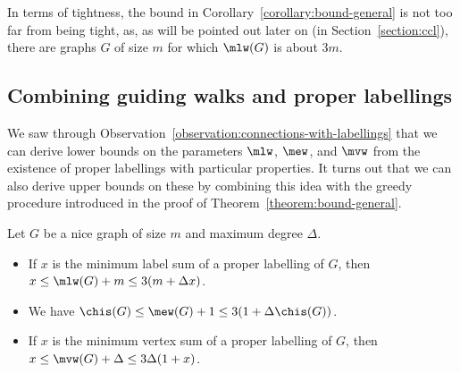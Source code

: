 \documentclass[a4paper,11pt,dvipsnames]{elsarticle}
\begin{document}
\medskip

In terms of tightness, the bound in Corollary~\ref{corollary:bound-general} is not too far from being tight, as, as will be pointed out later on (in Section~\ref{section:ccl}), there are graphs $G$ of size $m$ for which $\mlw(G)$ is about $3m$.

\subsection{Combining guiding walks and proper labellings}

We saw through Observation~\ref{observation:connections-with-labellings} that we can derive lower bounds on the parameters $\mlw$, $\mew$, and $\mvw$ from the existence of proper labellings with particular properties. It turns out that we can also derive upper bounds on these by combining this idea with the greedy procedure introduced in the proof of Theorem~\ref{theorem:bound-general}.

\begin{theorem}\label{theorem:bounds-parameters-greedy-proper}
Let $G$ be a nice graph of size $m$ and maximum degree $\Delta$.
\begin{itemize}
	\item If $x$ is the minimum label sum of a proper labelling of $G$,
	then $x \leq \mlw(G)+m \leq 3(m+\Delta x)$.
	\item We have $\chis(G) \leq \mew(G)+1 \leq 3(1+\Delta\chis(G))$.
	\item If $x$ is the minimum vertex sum of a proper labelling of $G$,
	then $x \leq \mvw(G)+\Delta \leq 3\Delta(1+x)$.
\end{itemize}
\end{theorem}
\end{document}
